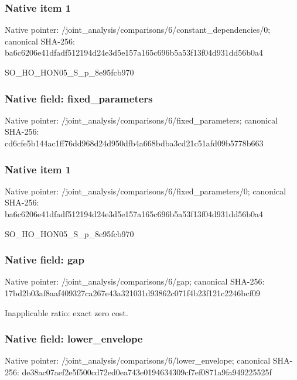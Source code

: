 \documentclass[10pt,a4paper]{article}
\begin{document}
\subsubsection{Native item 1}
Native pointer: /joint\_\allowbreak{}analysis/comparisons/6/constant\_\allowbreak{}dependencies/0; canonical SHA-256: ba6c6206e41dfadf512194d24e3d5e157a165c696b5a53f13f04d931dd56b0a4

\begingroup\raggedright\sloppy SO\_\allowbreak{}HO\_\allowbreak{}HON05\_\allowbreak{}S\_\allowbreak{}p\_\allowbreak{}8e95fcb970\par\endgroup

\subsubsection{Native field: fixed\_\allowbreak{}parameters}
Native pointer: /joint\_\allowbreak{}analysis/comparisons/6/fixed\_\allowbreak{}parameters; canonical SHA-256: cd6cfe5b144ac1ff76dd968d24d950dfb4a668bdba3cd21c51afd09b5778b663

\subsubsection{Native item 1}
Native pointer: /joint\_\allowbreak{}analysis/comparisons/6/fixed\_\allowbreak{}parameters/0; canonical SHA-256: ba6c6206e41dfadf512194d24e3d5e157a165c696b5a53f13f04d931dd56b0a4

\begingroup\raggedright\sloppy SO\_\allowbreak{}HO\_\allowbreak{}HON05\_\allowbreak{}S\_\allowbreak{}p\_\allowbreak{}8e95fcb970\par\endgroup

\subsubsection{Native field: gap}
Native pointer: /joint\_\allowbreak{}analysis/comparisons/6/gap; canonical SHA-256: 17bd2b03af8aaf409327ca267e43a321031d93862c071f4b23f121c2246bcf09

\begingroup\raggedright\sloppy Inapplicable ratio:\allowbreak{} exact zero cost.\par\endgroup

\subsubsection{Native field: lower\_\allowbreak{}envelope}
Native pointer: /joint\_\allowbreak{}analysis/comparisons/6/lower\_\allowbreak{}envelope; canonical SHA-256: de38ac07aef2e5f500cd72ed0ea743e0194634309cf7ef0871a9fa949225525f
\end{document}
